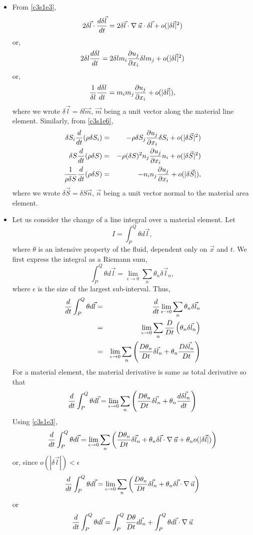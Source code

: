 \begin{itemize}
\item From \eqref{c3s1e3},
\[
2\delta\vec{l}\cdot\frac{d{\delta\vec{l}}}{d{t}} = 2\delta\vec{l}\cdot\operatorname{\nabla}\vec{u}\cdot\delta\vec{l} + o(|\delta\vec{l}|^2)
\]
or,
\[
2\delta{l}\frac{d{\delta{l}}}{d{t}} = 2\delta{l}m_i\frac{\partial{u_j}}{\partial{x_i}}\delta{l}m_j + o(|\delta\vec{l}|^2)
\]
or,
\begin{equation}\label{c3s1e7}
\frac{1}{\delta{l}}\frac{d{\delta{l}}}{d{t}} = m_im_j\frac{\partial{u_j}}{\partial{x_i}} + o(|\delta\vec{l}|),
\end{equation}
where we wrote $\delta\vec{l} = \delta{l}\vec{m}$, $\vec{m}$ being a unit vector along the material line element. Similarly, from \eqref{c3s1e6},
\begin{eqnarray}
\delta S_i \frac{d}{dt}(\rho\delta S_i) &=& -\rho\delta S_j \frac{\partial{u_j}}{\partial{x_i}}\delta S_i + o(|\delta\vec{S}|^2) \nonumber \\
\delta S \frac{d}{dt}(\rho\delta S) &=& -\rho(\delta S)^2 n_j\frac{\partial{u_j}}{\partial{x_i}}n_i + o(|\delta\vec{S}|^2) \nonumber \\
\frac{1}{\rho\delta S}\frac{d}{dt}(\rho\delta S) &=& -n_in_j\frac{\partial{u_j}}{\partial{x_i}} + o(|\delta\vec{S}|), \label{c3s1e7a}
\end{eqnarray}
where we wrote $\delta\vec{S} = \delta{S}\vec{n}$, $\vec{n}$ being a unit vector normal to the material area element.

\item Let us consider the change of a line integral over a material element. Let
\[
I = \int_P^Q \theta d\vec{l},
\]
where $\theta$ is an intensive property of the fluid, dependent only on $\vec{x}$ and $t$. We first express the integral as a Riemann sum,
\[
\int_P^Q \theta d\vec{l} = \lim_{\epsilon \rightarrow 0}\sum_n \theta_n \delta\vec{l}_n,  
\]
where $\epsilon$ is the size of the largest sub-interval. Thus,
\begin{eqnarray*}
\frac{d}{dt}\int_P^Q \theta d\vec{l} &=& \frac{d}{dt}\lim_{\epsilon \rightarrow 0}\sum_n \theta_n \delta\vec{l}_n \\
 &=& \lim_{\epsilon \rightarrow 0}\sum_n \frac{D}{Dt}\left(\theta_n \delta\vec{l}_n \right) \\
 &=& \lim_{\epsilon \rightarrow 0}\sum_n \left(\frac{D{\theta_n}}{Dt}\delta\vec{l}_n + \theta_n\frac{D{\delta\vec{l}_n}}{Dt} \right) 
\end{eqnarray*}
For a material element, the material derivative is same as total derivative so that
\[
\frac{d}{dt}\int_P^Q \theta d\vec{l} = \lim_{\epsilon \rightarrow 0}\sum_n \left(\frac{D{\theta_n}}{Dt}\delta\vec{l}_n + \theta_n\frac{d{\delta\vec{l}_n}}{d{t}} \right) 
\]
Using \eqref{c3s1e3},
\[
\frac{d}{dt}\int_P^Q \theta d\vec{l} = \lim_{\epsilon \rightarrow 0}\sum_n \left(\frac{D{\theta_n}}{Dt}\delta\vec{l}_n + \theta_n\delta\vec{l}\cdot\operatorname{\nabla}\vec{u} + \theta_no(|\delta\vec{l}|) \right) 
\]
or, since $o(|\delta\vec{l}|) < \epsilon$
\[
\frac{d}{dt}\int_P^Q \theta d\vec{l} = \lim_{\epsilon \rightarrow 0}\sum_n \left(\frac{D{\theta_n}}{Dt}\delta\vec{l}_n + \theta_n\delta\vec{l}\cdot\operatorname{\nabla}\vec{u}\right)
\]
or
\begin{equation}\label{c3s1e8}
\frac{d}{dt}\int_P^Q \theta d\vec{l} = \int_P^Q \frac{D{\theta}}{Dt}d\vec{l}_n + \int_P^Q \theta d\vec{l}\cdot\operatorname{\nabla}\vec{u}
\end{equation}


\end{itemize}
